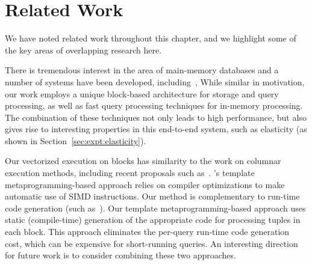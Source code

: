 
\section{Related Work} \label{related}
We have noted related work throughout this chapter, and we highlight some of the key areas of overlapping research here. 

There is tremendous interest in the area of main-memory databases and a number of systems have been developed, including~\cite{LarsonCFHMNPPRRS13, BonczKM08, RamanABCKKLLLLMMPSSSSZ13, hyper, XinRZFSS13, scuba, SparkSQL, vectorwise, FarberMLGMRD12, oracledbim}, 
While similar in motivation, our work employs a unique block-based architecture for storage and query processing, as well as fast query processing techniques for in-memory processing. The combination of these techniques not only leads to high performance, but also gives rise to interesting properties in this end-to-end system, such as elasticity (as shown in Section~\ref{sec:expt:elasticity}).

Our vectorized execution on blocks has similarity to the work on columnar execution methods, including recent proposals such as~\cite{SIMD-DBMS, RamanSQRDKNS08, JohnsonRSS08,WillhalmPBPZS09, WillhalmO0F13, bitweaving, AbadiMF06,  QiaoRRHL08, FengLKX15}. 
\Quickstep's template metaprogramming-based approach relies on compiler optimizations to make automatic use of SIMD instructions. Our method is complementary to run-time code generation (such as~\cite{JohnsonRSS08,WillhalmPBPZS09, WillhalmO0F13, AbadiMF06,  QiaoRRHL08, FengLKX15, archofadb, Neumann11, SparkSQL, PirkMZM16, NagelBV14, SIMD-DBMS, RamanSQRDKNS08}). Our template metaprogramming-based approach uses static (compile-time) generation of the appropriate code for processing tuples in each block. This approach eliminates the per-query run-time code generation cost, which can be expensive for short-running queries. An interesting direction for future work is to consider combining these two approaches.

